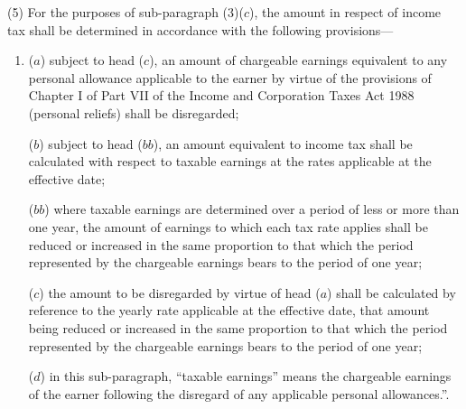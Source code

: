 \documentclass[12pt,a4paper]{article}
\begin{document}
%

(5) For the purposes of sub-paragraph (3)($c$), the amount in respect of income tax shall be determined in accordance with the following provisions—
\begin{enumerate}\item[]
($a$) subject to head ($c$), an amount of chargeable earnings equivalent to any personal allowance applicable to the earner by virtue of the provisions of Chapter I of Part VII of the Income and Corporation Taxes Act 1988 (personal reliefs) shall be disregarded;

($b$) 
subject to head ($bb$),  %
an amount equivalent to income tax shall be calculated with respect to taxable earnings at the rates applicable at the effective date;

($bb$) where taxable earnings are determined over a period of less or more than one year, the amount of earnings to which each tax rate applies shall be reduced or increased in the same proportion to that which the period represented by the chargeable earnings bears to the period of one year;

($c$) the amount to be disregarded by virtue of head ($a$) shall be calculated by reference to the yearly rate applicable at the effective date, that amount being reduced or increased in the same proportion to that which the period represented by the chargeable earnings bears to the period of one year;

($d$) in this sub-paragraph, “taxable earnings” means the chargeable earnings of the earner following the disregard of any applicable personal allowances.”.
\end{enumerate}
\end{document}
